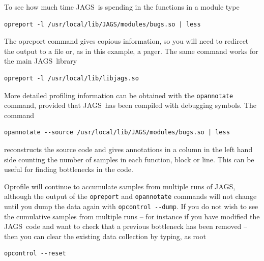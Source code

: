 \documentclass[11pt, a4paper, titlepage]{report}
\newcommand{\JAGS}{\textsf{JAGS}}
\begin{document}
To see how much time \JAGS\ is spending in the functions in a module
type
\begin{verbatim}
opreport -l /usr/local/lib/JAGS/modules/bugs.so | less
\end{verbatim}
The opreport command gives copious information, so you will need to
redirect the output to a file or, as in this example, a pager.
The same command works for the main \JAGS\ library
\begin{verbatim}
opreport -l /usr/local/lib/libjags.so
\end{verbatim}

More detailed profiling information can be obtained with the
\verb+opannotate+ command, provided that \JAGS\ has been compiled
with debugging symbols. The command
\begin{verbatim}
opannotate --source /usr/local/lib/JAGS/modules/bugs.so | less
\end{verbatim}
reconstructs the source code and gives annotations in a column in
the left hand side counting the number of samples in each function,
block or line. This can be useful for finding bottlenecks in the code.

Oprofile will continue to accumulate samples from multiple runs of JAGS,
although the output of the \verb+opreport+ and \verb+opannotate+ commands
will not change until you dump the data again with \verb+opcontrol --dump+.
If you do not wish to see the cumulative samples from multiple runs --
for instance if you have modified the \JAGS\ code and want to check that
a previous bottleneck has been removed -- then you can clear the existing
data collection by typing, as root
\begin{verbatim}
opcontrol --reset
\end{verbatim}
\end{document}

